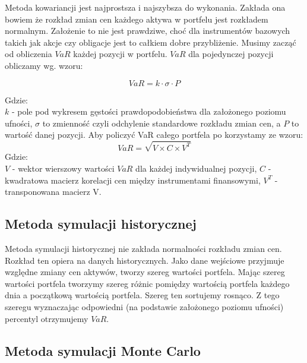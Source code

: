 \documentclass[11pt,titlepage]{article}
\begin{document}
Metoda kowariancji jest najprostsza i najszybsza do wykonania. Zakłada ona bowiem że rozkład zmian cen każdego aktywa w portfelu jest rozkładem normalnym. Założenie to nie jest prawdziwe, choć dla instrumentów bazowych takich jak akcje czy obligacje jest to całkiem dobre przybliżenie. Musimy zacząć od obliczenia $VaR$ każdej pozycji w portfelu. $VaR$ dla pojedynczej pozycji obliczamy wg. wzoru:

$$ VaR = k \cdot \sigma \cdot P $$

\noindent Gdzie:\\
\noindent $ k $ - pole pod wykresem gęstości prawdopodobieństwa dla założonego poziomu ufności, 
$ \sigma $ to zmienność czyli odchylenie standardowe rozkładu zmian cen, a $ P $ to wartość danej pozycji.
Aby policzyć VaR całego portfela po korzystamy ze wzoru:
$$ VaR=\sqrt{V \times C \times V^{T}} $$
\noindent Gdzie:\\
\noindent $ V $ - wektor wierszowy wartości $VaR$ dla każdej indywidualnej pozycji, $ C $ - kwadratowa macierz korelacji cen między instrumentami finansowymi, $ V^{T} $ - transponowana macierz V.\\

\subsection{Metoda symulacji historycznej}
Metoda symulacji historycznej nie zakłada normalności rozkładu zmian cen. Rozkład ten opiera na danych historycznych. Jako dane wejściowe przyjmuje względne zmiany cen aktywów, tworzy szereg wartości portfela. Mając szereg wartości portfela tworzymy szereg różnic pomiędzy wartością portfela każdego dnia a początkową wartością portfela. Szereg ten sortujemy rosnąco. Z tego szeregu wyznaczając odpowiedni (na podstawie założonego poziomu ufności) percentyl otrzymujemy $VaR$.\\








\newpage

\subsection{Metoda symulacji Monte Carlo}
\end{document}
